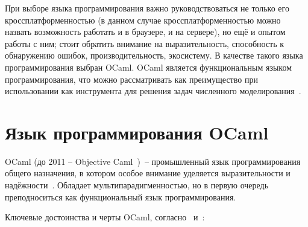 При выборе языка программирования важно руководствоваться не только его кроссплатформенностью
(в данном случае кроссплатформенностью можно назвать возможность работать и в браузере, и на сервере),
но ещё и опытом работы с ним; стоит обратить внимание на выразительность, способность к обнаружению ошибок,
производительность, экосистему. В качестве такого языка программирования выбран OCaml.
OCaml является функциональным языком программирования, что можно рассматривать как преимущество
при использовании как инструмента для решения задач численного моделирования~\cite{shutov-haskell}.

\section{Язык программирования OCaml}

OCaml (до 2011 -- Objective Caml~\cite{camlhistory})~-- промышленный язык программирования общего назначения,
в котором особое внимание уделяется выразительности и надёжности~\cite{ocamlorg}. Обладает
мультипарадигменностью, но в первую очередь преподноситься как функциональный язык программирования.

Ключевые достоинства и черты OCaml, согласно~\cite[c.~3]{yaron2011} и~\cite{rwo-prologue}:

